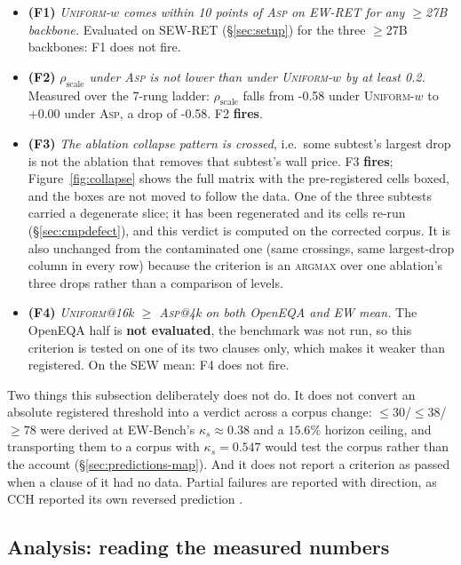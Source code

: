 \documentclass[10pt]{article}
\newcommand{\VkappaS}{0.547}
\newcommand{\VnBackbones}{seven}
\providecommand{\VFone}{not evaluated}
\providecommand{\VFtwo}{not evaluated}
\providecommand{\VFthree}{not evaluated}
\providecommand{\VFfour}{not evaluated}
\providecommand{\VrhoUnif}{--}
\providecommand{\VrhoAsp}{--}
\providecommand{\VrhoDrop}{--}
\providecommand{\VnBackbones}{--}
\renewcommand{\VFone}{does not fire}
\renewcommand{\VFtwo}{\textbf{fires}}
\renewcommand{\VFthree}{\textbf{fires}}
\renewcommand{\VFfour}{does not fire}
\renewcommand{\VrhoUnif}{-0.58}
\renewcommand{\VrhoAsp}{+0.00}
\renewcommand{\VrhoDrop}{-0.58}
\renewcommand{\VnBackbones}{7}
\theoremstyle{definition}
\theoremstyle{plain}
\newcommand{\ASP}{\textsc{Asp}}
\begin{document}
\begin{itemize}[leftmargin=1.6em,itemsep=2pt]
\item \textbf{(F1)} \emph{\textsc{Uniform-}$w$ comes within 10 points of \ASP{} on EW-RET for any $\ge$27B backbone.} Evaluated on SEW-RET (\S\ref{sec:setup}) for the three $\ge$27B backbones: F1 \VFone{}.
\item \textbf{(F2)} \emph{$\rho_{\mathrm{scale}}$ under \ASP{} is not lower than under \textsc{Uniform-}$w$ by at least 0.2.} Measured over the \VnBackbones{}-rung ladder: $\rho_{\mathrm{scale}}$ falls from \VrhoUnif{} under \textsc{Uniform-}$w$ to \VrhoAsp{} under \ASP{}, a drop of \VrhoDrop{}. F2 \VFtwo{}.
\item \textbf{(F3)} \emph{The ablation collapse pattern is crossed}, i.e.\ some subtest's largest drop is not the ablation that removes that subtest's wall price. F3 \VFthree{}; Figure~\ref{fig:collapse} shows the full matrix with the pre-registered cells boxed, and the boxes are not moved to follow the data. One of the three subtests carried a degenerate slice; it has been regenerated and its cells re-run (\S\ref{sec:cmpdefect}), and this verdict is computed on the corrected corpus. It is also unchanged from the contaminated one (same crossings, same largest-drop column in every row) because the criterion is an \textsc{argmax} over one ablation's three drops rather than a comparison of levels.
\item \textbf{(F4)} \emph{\textsc{Uniform}@16k $\ge$ \ASP{}@4k on both OpenEQA and EW mean.} The OpenEQA half is \textbf{not evaluated}, the benchmark was not run, so this criterion is tested on one of its two clauses only, which makes it weaker than registered. On the SEW mean: F4 \VFfour{}.
\end{itemize}

\noindent Two things this subsection deliberately does not do. It does not convert an absolute registered threshold into a verdict across a corpus change: $\le30$/$\le38$/$\ge78$ were derived at EW-Bench's $\kappa_s\approx0.38$ and a $15.6\%$ horizon ceiling, and transporting them to a corpus with $\kappa_s{=}\VkappaS{}$ would test the corpus rather than the account (\S\ref{sec:predictions-map}). And it does not report a criterion as passed when a clause of it had no data. Partial failures are reported with direction, as CCH reported its own reversed prediction \citep{cch}.


\subsection{Analysis: reading the measured numbers}
\end{document}
